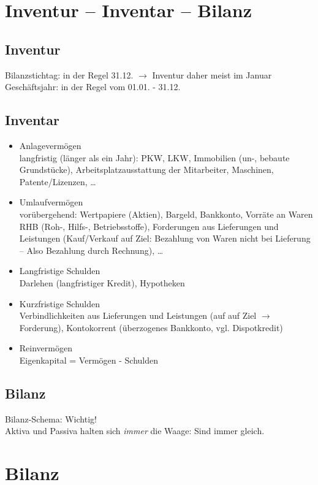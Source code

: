 \documentclass{scrreprt}
\begin{document}
\section{Inventur -- Inventar -- Bilanz}
\subsection{Inventur}
Bilanzstichtag: in der Regel 31.12. $\to$ Inventur daher meist im Januar\\
Geschäftsjahr: in der Regel vom 01.01. - 31.12.
\subsection{Inventar}
\begin{itemize}
\item Anlagevermögen\\
langfristig (länger als ein Jahr): PKW, LKW, Immobilien (un-, bebaute Grundstücke), Arbeitsplatzausstattung der Mitarbeiter, Maschinen, Patente/Lizenzen, …
\item Umlaufvermögen\\
vorübergehend: Wertpapiere (Aktien), Bargeld, Bankkonto, Vorräte an Waren RHB (Roh-, Hilfs-, Betriebsstoffe), Forderungen aus Lieferungen und Leistungen (Kauf/Verkauf auf Ziel: Bezahlung von Waren nicht bei Lieferung -- Also Bezahlung durch Rechnung), …
\item Langfristige Schulden\\
Darlehen (langfristiger Kredit), Hypotheken
\item Kurzfristige Schulden\\
Verbindlichkeiten aus Lieferungen und Leistungen (auf auf Ziel $\to$ Forderung), Kontokorrent (überzogenes Bankkonto, vgl. Dispotkredit)
\item Reinvermögen\\
Eigenkapital = Vermögen - Schulden
\end{itemize}
\subsection{Bilanz}
Bilanz-Schema: Wichtig!\\
Aktiva und Passiva halten sich \emph{immer} die Waage: Sind immer gleich.

\section{Bilanz}
\end{document}
